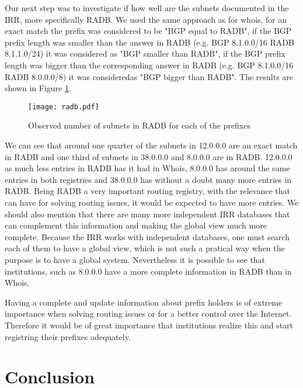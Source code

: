 \documentclass[11pt,a4paper]{scrreprt}
\begin{document}
Our next step was to investigate if how well are the subnets documented in the IRR,  more specifically RADB. We used the same approach as for whois, for an exact match the prefix was considered to be "BGP equal to RADB", if the BGP prefix length was smaller than the answer in RADB (e.g. BGP 8.1.0.0/16 RADB 8.1.1.0/24) it was considered as "BGP smaller than RADB", if the BGP prefix length was bigger than the corresponding answer in RADB (e.g. BGP 8.1.0.0/16 RADB 8.0.0.0/8) it was consideredas "BGP bigger than RADB". The results are shown in Figure \ref{fig:radb}.

\begin{figure}[!h]
\centering
\texttt{[image: radb.pdf]}
\caption{Observed number of subnets in RADB for each of the prefixes}
\label{fig:radb}
\end{figure}

We can see that around one quarter of the subnets in 12.0.0.0 are an exact match in RADB and one third of subnets in 38.0.0.0 and 8.0.0.0 are in RADB. 12.0.0.0 as much less entries in RADB has it had in Whois, 8.0.0.0 has around the same entries in both registries and 38.0.0.0 has without a doubt many more entries in RADB. Being RADB a very important routing registry, with the relevance that can have for solving routing issues, it would be expected to have more entries. We should also mention that there are many more independent IRR databases that can complement this information and making the global view much more complete. Because the IRR works with independent databases, one must search each of them to have a global view, which is not such a pratical way when the purpose is to have a global system.
Nevertheless it is possible to see that institutions, such as 8.0.0.0 have a more complete information in RADB than in Whois. 

Having a complete and update information about prefix holders is of extreme importance when solving routing issues or for a better control over the Internet. Therefore it would be of great importance that institutions realize this and start registring their prefixes adequately.

\clearpage
\chapter{Conclusion}
\end{document}
